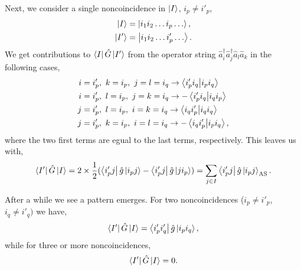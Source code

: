Next, we consider a single noncoincidence in $\ket{I}$, $i_p \neq i'_p$,
\begin{align}
    \ket{I} &= \ket{i_1 i_2 \dots i_p \dots}, \\
    \ket{I'} &= \ket{i_1 i_2 \dots i'_p \dots}.
\end{align}
We get contributions to $\bra{I} \hat{G} \ket{I'}$ from the operator string
$\hat{a}^\dagger_i \hat{a}^\dagger_j \hat{a}_l \hat{a}_k$ in the following
cases,
\begin{align}
   i &= i'_p, \ k = i_p, \ j = l = i_q \to \braket{i'_p i_q}{i_p i_q} \\  
   i &= i'_p, \ l = i_p, \ j = k = i_q \to -\braket{i'_p i_q}{i_q i_p} \\
   j &= i'_p, \ l = i_p, \ i = k = i_q \to \braket{i_q i'_p}{i_q i_q} \\
   j &= i'_p, \ k = i_p, \ i = l = i_q \to -\braket{i_q i'_p}{i_p i_q},
\end{align}
where the two first terms are egual to the last terms, respectively. This leaves
us with,
\begin{equation}
    \bra{I'}\hat{G}\ket{I} 
    = 2 \times \frac{1}{2} 
    (\bra{i'_p j}\hat{g}\ket{i_p j} - \bra{i'_p j}\hat{g}\ket{j i_p})
    = \sum_{j\in I} \bra{i'_p j} \hat{g} \ket{i_p j}_{\text{AS}}.
\end{equation}

After a while we see a pattern emerges. For two noncoincidences 
($i_p \neq i'_p$, $i_q \neq i'_q)$ we have,
\begin{equation}
    \bra{I'} \hat{G} \ket{I} = \bra{i'_p i'_q} \hat{g} \ket{i_p i_q},
\end{equation}
while for three or more noncoincidences,
\begin{equation}
    \bra{I'} \hat{G} \ket{I} = 0. 
\end{equation}
